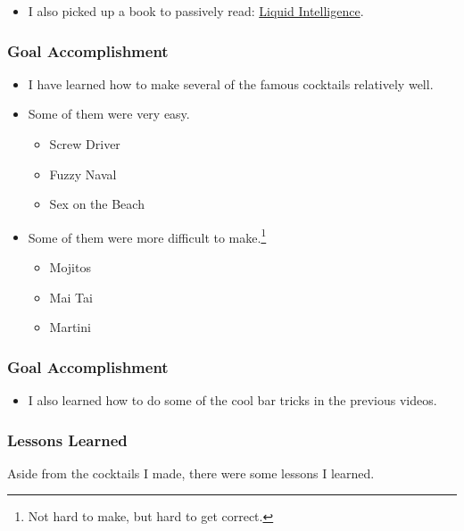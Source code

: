 \documentclass[xclolor=dvipsnames]{beamer}            %
\begin{document}
\begin{darkframes}
\begin{frame}
\begin{itemize}
            \item I also picked up a book to passively read: \href{https://www.amazon.com/Liquid-Intelligence-Science-Perfect-Cocktail-ebook/dp/B00J8R3KOE}{Liquid Intelligence}.
        \end{itemize}
    \end{frame}

    \begin{frame}
        \frametitle{Goal Accomplishment}

        \begin{itemize}
            \item I have learned how to make several of the famous cocktails relatively well.

            \item Some of them were very easy.
                \begin{itemize}
                    \item Screw Driver
                    \item Fuzzy Naval
                    \item Sex on the Beach
                \end{itemize}

            \item Some of them were more difficult to make.\footnote{Not hard to make, but hard to get correct.}
                \begin{itemize}
                    \item Mojitos
                    \item Mai Tai
                    \item Martini
                \end{itemize}
        \end{itemize}
    \end{frame}

    \begin{frame}
        \frametitle{Goal Accomplishment}

        \begin{itemize}
            \item I also learned how to do some of the cool bar tricks in the previous videos.
        \end{itemize}
    \end{frame}


    \begin{frame}
        \frametitle{Lessons Learned}

        Aside from the cocktails I made, there were some lessons I learned.


\end{frame}
\end{darkframes}
\end{document}
